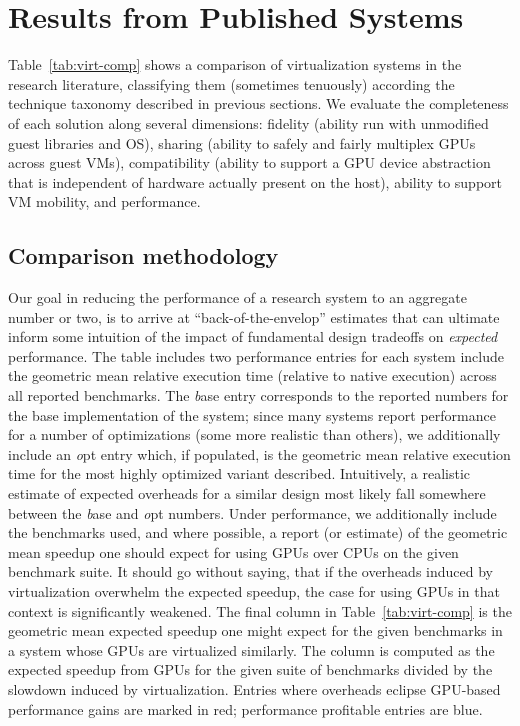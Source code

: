 
\section{Results from Published Systems}
\label{sec:pub-results}


Table~\ref{tab:virt-comp} shows a comparison of virtualization systems in the research literature,
classifying them (sometimes tenuously) according the technique taxonomy described in previous sections.
We evaluate the completeness of each solution along several dimensions:
fidelity (ability run with unmodified guest libraries and OS), sharing (ability to safely and
fairly multiplex GPUs across guest VMs), compatibility (ability to support a GPU device abstraction
that is independent of hardware actually present on the host), ability to support VM mobility,
and performance.

\subsection{Comparison methodology}

Our goal in reducing the performance of a research system to an aggregate number or two,
is to arrive at ``back-of-the-envelop'' estimates that can ultimate inform some intuition of
the impact of fundamental design tradeoffs on {\it expected} performance. The table includes
two performance entries for each system include the geometric
mean relative execution time (relative to native execution) across all reported benchmarks. The {\emph base} entry
corresponds to the reported numbers for the base implementation of the system; since many systems
report performance for a number of optimizations (some more realistic than others), we
additionally include an {\emph opt} entry which, if populated, is the geometric mean relative execution time for the
most highly optimized variant described. Intuitively, a realistic estimate of expected overheads
for a similar design most likely fall somewhere between the {\emph base} and {\emph opt} numbers.
Under performance, we additionally include the benchmarks used, and where possible,
a report (or estimate) of the geometric mean speedup one should expect for using GPUs over CPUs
on the given benchmark suite. It should go without saying, that if the overheads induced by
virtualization overwhelm the expected speedup, the case for using GPUs in that context
is significantly weakened. The final column in Table~\ref{tab:virt-comp} is the geometric mean expected
speedup one might expect for the given benchmarks in a system whose GPUs are virtualized similarly.
The column is computed as the expected speedup from GPUs for the given suite of benchmarks divided
by the slowdown induced by virtualization. Entries where overheads eclipse GPU-based performance
gains are marked in red; performance profitable entries are blue.

